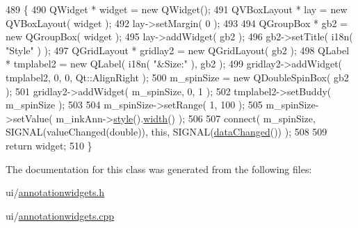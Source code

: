\begin{DoxyCode}
489 \{
490     QWidget * widget = \textcolor{keyword}{new} QWidget();
491     QVBoxLayout * lay = \textcolor{keyword}{new} QVBoxLayout( widget );
492     lay->setMargin( 0 );
493 
494     QGroupBox * gb2 = \textcolor{keyword}{new} QGroupBox( widget );
495     lay->addWidget( gb2 );
496     gb2->setTitle( i18n( \textcolor{stringliteral}{"Style"} ) );
497     QGridLayout * gridlay2 = \textcolor{keyword}{new} QGridLayout( gb2 );
498     QLabel * tmplabel2 = \textcolor{keyword}{new} QLabel( i18n( \textcolor{stringliteral}{"&Size:"} ), gb2 );
499     gridlay2->addWidget( tmplabel2, 0, 0, Qt::AlignRight );
500     m\_spinSize = \textcolor{keyword}{new} QDoubleSpinBox( gb2 );
501     gridlay2->addWidget( m\_spinSize, 0, 1 );
502     tmplabel2->setBuddy( m\_spinSize );
503 
504     m\_spinSize->setRange( 1, 100 );
505     m\_spinSize->setValue( m\_inkAnn->\hyperlink{classOkular_1_1Annotation_ae1f845ddbd6d524b2b388c6c9ef26423}{style}().\hyperlink{classOkular_1_1Annotation_1_1Style_a5a8e23f3a4f95e25f45770937dc82948}{width}() );
506 
507     connect( m\_spinSize, SIGNAL(valueChanged(\textcolor{keywordtype}{double})), \textcolor{keyword}{this}, SIGNAL(\hyperlink{classAnnotationWidget_af9dcb02a8b69a602225c9844b5deb6d4}{dataChanged}()) );
508 
509     \textcolor{keywordflow}{return} widget;
510 \}
\end{DoxyCode}


The documentation for this class was generated from the following files\+:\begin{DoxyCompactItemize}
\item 
ui/\hyperlink{annotationwidgets_8h}{annotationwidgets.\+h}\item 
ui/\hyperlink{annotationwidgets_8cpp}{annotationwidgets.\+cpp}\end{DoxyCompactItemize}
